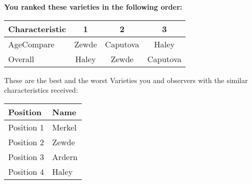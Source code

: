 \documentclass[10pt]{article}
\begin{document}
\begin{titlepage}
\begin{flushleft}
\begin{tabularx}{\textwidth}{ X | c  }
		\end{tabularx}\newline \newline

		\textbf{You ranked these varieties in the following order: }\hfill \break
		\begin{tabularx}{\textwidth}{ X | c | c | c  }
			\hline
			\textbf{Characteristic}
			
				& \textbf{ 1 }
			
				& \textbf{ 2 }
			
				& \textbf{ 3 }
			
			\\ \hline


			
				AgeCompare & Zewde  & Caputova  & Haley  \\ \hline


			
				Overall & Haley  & Zewde  & Caputova  \\ \hline


			

		\end{tabularx}

	\end{flushleft}

	\pagebreak

	\begin{flushleft}
		These are the best and the worst Varieties you and observers with the similar characteristics received:\hfill \break \newline
		\begin{tabularx}{\textwidth}{ X | X  }
			\hline
			\textbf{Position} & \textbf{Name} \\ \hline

			

				Position 1 & Merkel \\ \hline
			

				Position 2 & Zewde \\ \hline
			

				Position 3 & Ardern \\ \hline
			

				Position 4 & Haley \\ \hline
			


\end{tabularx}
\end{flushleft}
\end{titlepage}
\end{document}
